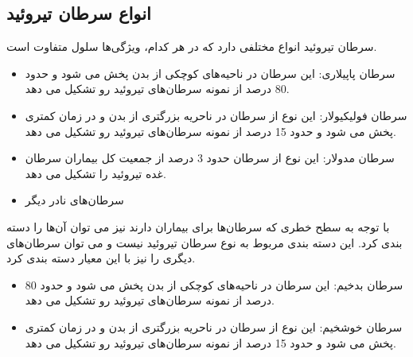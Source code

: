 \subsection{انواع سرطان تیروئید}\label{subsec:انواع-سرطان-تیروئید}

سرطان تیروئید انواع مختلفی دارد که در هر کدام، ویژگی‌ها سلول متفاوت است.

\begin{itemize}
    \item سرطان پاپیلاری:
    این سرطان در ناحیه‌های کوچکی از بدن پخش می شود و حدود 80 درصد از نمونه سرطان‌های تیروئید رو تشکیل می دهد.
    \item سرطان فولیکیولار:
    این نوع از سرطان در ناحریه بزرگتری از بدن و در زمان کمتری پخش می شود و حدود 15 درصد از نمونه سرطان‌های تیروئید رو تشکیل می دهد.
    \item سرطان مدولار:
    این نوع از سرطان حدود 3 درصد از جمعیت کل بیماران سرطان غده تیروئید را تشکیل می دهد.
    \item سرطان‌های نادر دیگر
\end{itemize}

با توجه به سطح خطری که سرطان‌ها برای بیماران دارند نیز می توان آن‌ها را دسته بندی کرد.
این دسته بندی مربوط به نوع سرطان تیروئید نیست و می توان سرطان‌های دیگری را نیز با این معیار دسته بندی کرد.
\begin{itemize}
    \item سرطان بدخیم:
    این سرطان در ناحیه‌های کوچکی از بدن پخش می شود و حدود 80 درصد از نمونه سرطان‌های تیروئید رو تشکیل می دهد.
    \item سرطان خوشخیم:
    این نوع از سرطان در ناحریه بزرگتری از بدن و در زمان کمتری پخش می شود و حدود 15 درصد از نمونه سرطان‌های تیروئید رو تشکیل می دهد.
\end{itemize}

\newpage